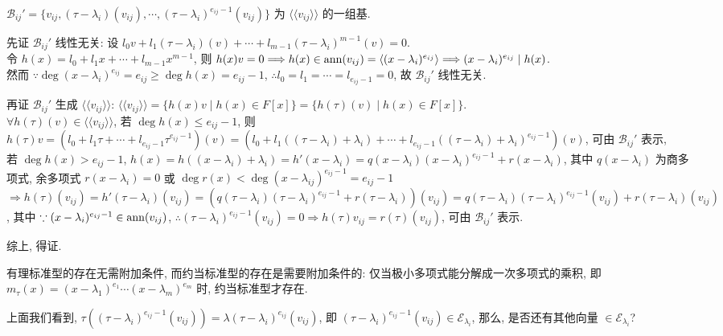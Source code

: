 \documentclass{note}
\begin{document}
$\mathcal{B}_{ij}'=\{v_{ij},(\tau-\lambda_i)(v_{ij}),\cdots,(\tau-\lambda_i)^{e_{ij}-1}(v_{ij})\}$ 为 $\langle\langle v_{ij}\rangle\rangle$ 的一组基.
\begin{pf}
    先证 $\mathcal{B}_{ij}'$ 线性无关: 设 $l_0v+l_1(\tau-\lambda_i)(v)+\cdots+l_{m-1}(\tau-\lambda_i)^{m-1}(v)=0$.\\
    令 $h(x)=l_0+l_1x+\cdots+l_{m-1}x^{m-1}$, 则 $h(x)v=0\Longrightarrow h(x)\in\operatorname{ann}(v_{ij})=\langle(x-\lambda_i)^{e_{ij}}\rangle\Longrightarrow(x-\lambda_i)^{e_{ij}}\mid h(x)$.\\
    然而 $\because\deg(x-\lambda_i)^{e_{ij}}=e_{ij}\geq\deg h(x)=e_{ij}-1$, $\therefore l_0=l_1=\cdots=l_{e_{ij}-1}=0$, 故 $\mathcal{B}_{ij}'$ 线性无关.

    再证 $\mathcal{B}_{ij}'$ 生成 $\langle\langle v_{ij}\rangle\rangle$: $\langle\langle v_{ij}\rangle\rangle=\{h(x)v\mid h(x)\in F[x]\}=\{h(\tau)(v)\mid h(x)\in F[x]\}$.\\
    $\forall h(\tau)(v)\in\langle\langle v_{ij}\rangle\rangle$, 若 $\deg h(x)\leq e_{ij}-1$, 则 $h(\tau)v=(l_0+l_1\tau+\cdots+l_{e_{ij}-1}\tau^{e_{ij}-1})(v)=(l_0+l_1((\tau-\lambda_i)+\lambda_i)+\cdots+l_{e_{ij}-1}((\tau-\lambda_i)+\lambda_i)^{e_{ij}-1})(v)$, 可由 $\mathcal{B}_{ij}'$ 表示,\\
    若 $\deg h(x)>e_{ij}-1$, $h(x)=h((x-\lambda_i)+\lambda_i)=h'(x-\lambda_i)=q(x-\lambda_i)(x-\lambda_i)^{e_{ij}-1}+r(x-\lambda_i)$, 其中 $q(x-\lambda_i)$ 为商多项式, 余多项式 $r(x-\lambda_i)=0$ 或 $\deg r(x)<\deg(x-\lambda_{ij})^{e_{ij}-1}=e_{ij}-1$\\
    $\Longrightarrow h(\tau)(v_{ij})=h'(\tau-\lambda_i)(v_{ij})=(q(\tau-\lambda_i)(\tau-\lambda_i)^{e_{ij}-1}+r(\tau-\lambda_i))(v_{ij})=q(\tau-\lambda_i)(\tau-\lambda_i)^{e_{ij}-1}(v_{ij})+r(\tau-\lambda_i)(v_{ij})$, 其中 $\because(x-\lambda_i)^{e_{ij}-1}\in\operatorname{ann}(v_{ij})$, $\therefore(\tau-\lambda_i)^{e_{ij}-1}(v_{ij})=0\Longrightarrow h(\tau)v_{ij}=r(\tau)(v_{ij})$, 可由 $\mathcal{B}_{ij}'$ 表示.

    综上, 得证.
\end{pf}

有理标准型的存在无需附加条件, 而约当标准型的存在是需要附加条件的: 仅当极小多项式能分解成一次多项式的乘积, 即 $m_{\tau}(x)=(x-\lambda_1)^{e_1}\cdots(x-\lambda_m)^{e_m}$ 时, 约当标准型才存在.

上面我们看到, $\tau((\tau-\lambda_i)^{e_{ij}-1}(v_{ij}))=\lambda(\tau-\lambda_i)^{e_{ij}}(v_{ij})$, 即 $(\tau-\lambda_i)^{e_{ij}-1}(v_{ij})\in\mathcal{E}_{\lambda_i}$, 那么, 是否还有其他向量 $\in\mathcal{E}_{\lambda_i}$?
\end{document}
